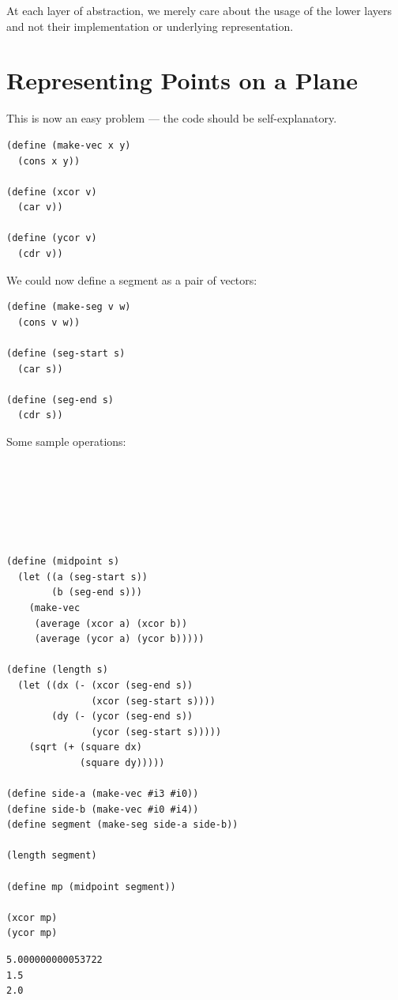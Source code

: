 \documentclass[9pt]{report}
\begin{document}
At each layer of abstraction, we merely care about the usage of
the lower layers and not their implementation or underlying
representation.

\section{Representing Points on a Plane}
\label{sec:org8c0e9c7}

This is now an easy problem --- the code should be
self-explanatory.

\begin{verbatim}
(define (make-vec x y)
  (cons x y))

(define (xcor v)
  (car v))

(define (ycor v)
  (cdr v))
\end{verbatim}

We could now define a segment as a pair of vectors:

\begin{verbatim}
(define (make-seg v w)
  (cons v w))

(define (seg-start s)
  (car s))

(define (seg-end s)
  (cdr s))
\end{verbatim}

Some sample operations:

\begin{verbatim}






(define (midpoint s)
  (let ((a (seg-start s))
        (b (seg-end s)))
    (make-vec
     (average (xcor a) (xcor b))
     (average (ycor a) (ycor b)))))

(define (length s)
  (let ((dx (- (xcor (seg-end s))
               (xcor (seg-start s))))
        (dy (- (ycor (seg-end s))
               (ycor (seg-start s)))))
    (sqrt (+ (square dx)
             (square dy)))))

(define side-a (make-vec #i3 #i0))
(define side-b (make-vec #i0 #i4))
(define segment (make-seg side-a side-b))

(length segment)

(define mp (midpoint segment))

(xcor mp)
(ycor mp)
\end{verbatim}

\begin{verbatim}
5.000000000053722
1.5
2.0
\end{verbatim}
\end{document}
